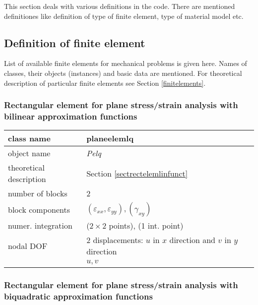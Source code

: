 This section deals with various definitions in the code. There are mentioned definitiones
like definition of type of finite element, type of material model etc.


\subsection{Definition of finite element}

List of available finite elements for mechanical problems is given here. Names of classes, their objects
(instances) and basic data are mentioned. For theoretical description of particular finite elements
see Section \ref{finitelements}.

\subsubsection{Rectangular element for plane stress/strain ana\-lysis with bilinear approximation functions}

\begin{center}
\begin{tabular}{|l|l|}
\hline
class name & {\sf planeelemlq}\index{class!{\sf planeelemlq}}
\\ \hline
object name & {\it Pelq}\index{instance!{\it Pelq}}
\\ \hline
theoretical description & Section \ref{sectrectelemlinfunct}
\\ \hline
number of blocks & 2
\\ \hline
block components & $(\varepsilon_{xx},\varepsilon_{yy}), (\gamma_{xy})$
\\ \hline
numer. integration & ($2 \times 2$ points), (1 int. point)
\\ \hline
nodal DOF & 2 displacements: $u$ in $x$ direction and $v$ in $y$ direction
\\ \cline{2-2}
 & $u,v$
\\ \hline
\end{tabular}
\end{center}

\subsubsection{Rectangular element for plane stress/strain ana\-lysis with biquadratic approximation functions}

